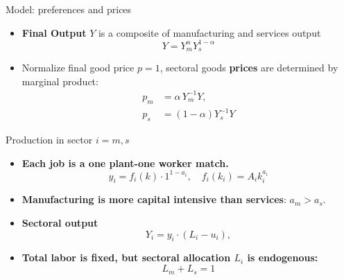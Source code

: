 \documentclass[9pt,xcolor={svgnames}]{beamer}
\begin{document}
\begin{frame}{Model: preferences and prices}\label{main:preference}
  \begin{itemize}
    \item \textbf{Final Output} $Y$ is a composite of manufacturing  and services output
      \[
        Y = Y_m^{\alpha}Y_s^{1-\alpha}
      \]
    \vspace{2mm}
\medskip
    \item Normalize final good price $p=1$, sectoral goods \textbf{prices} are determined by marginal product:
    \begin{align*}
             p_m &= \alpha\,Y_m^{-1}Y, \\
        p_s &= (1-\alpha)Y_s^{-1}Y
    \end{align*}
   
  \end{itemize}



\hyperlink{app:proof}{}

  
\end{frame}


\begin{frame}{Production in sector $i=m,s$}
  \begin{itemize}
    \item \textbf{Each job is a one plant-one worker match.} %
      \[
        y_i  =  f_i(k) \cdot 1^{1-a_i}, \quad f_i(k_i) =A_i k_i^{a_i}
      \]
    
      \medskip
      \item \textbf{Manufacturing is more capital intensive than services}: $a_m > a_s$.
    
    
    \medskip
    \item \textbf{Sectoral output}
      \[
       Y_i = y_i \cdot (L_i-u_i),
      \]
    \medskip
    \item \textbf{Total labor is fixed, but sectoral allocation $L_i$ is endogenous:}
      \[
        L_m+L_s =1
      \]


  \end{itemize}
\end{frame}
\end{document}
